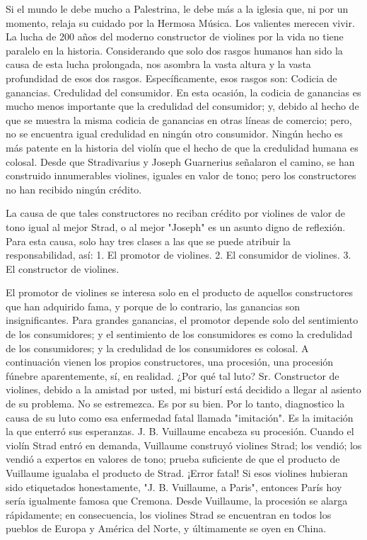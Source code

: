 \documentclass[12pt]{book}
\begin{document}
Si el mundo le debe mucho a Palestrina, le debe más a la iglesia que, ni por un momento, relaja su cuidado por la Hermosa Música. Los valientes merecen vivir. La lucha de 200 años del moderno constructor de violines por la vida no tiene paralelo en la historia. Considerando que solo dos rasgos humanos han sido la causa de esta lucha prolongada, nos asombra la vasta altura y la vasta profundidad de esos dos rasgos. Específicamente, esos rasgos son: Codicia de ganancias. Credulidad del consumidor. En esta ocasión, la codicia de ganancias es mucho menos importante que la credulidad del consumidor; y, debido al hecho de que se muestra la misma codicia de ganancias en otras líneas de comercio; pero, no se encuentra igual credulidad en ningún otro consumidor. Ningún hecho es más patente en la historia del violín que el hecho de que la credulidad humana es colosal. Desde que Stradivarius y Joseph Guarnerius señalaron el camino, se han construido innumerables violines, iguales en valor de tono; pero los constructores no han recibido ningún crédito.

La causa de que tales constructores no reciban crédito por violines de valor de tono igual al mejor Strad, o al mejor "Joseph" es un asunto digno de reflexión. Para esta causa, solo hay tres clases a las que se puede atribuir la responsabilidad, así: 1. El promotor de violines. 2. El consumidor de violines. 3. El constructor de violines.

El promotor de violines se interesa solo en el producto de aquellos constructores que han adquirido fama, y porque de lo contrario, las ganancias son insignificantes. Para grandes ganancias, el promotor depende solo del sentimiento de los consumidores; y el sentimiento de los consumidores es como la credulidad de los consumidores; y la credulidad de los consumidores es colosal. A continuación vienen los propios constructores, una procesión, una procesión fúnebre aparentemente, sí, en realidad. ¿Por qué tal luto? Sr. Constructor de violines, debido a la amistad por usted, mi bisturí está decidido a llegar al asiento de su problema. No se estremezca. Es por su bien. Por lo tanto, diagnostico la causa de su luto como esa enfermedad fatal llamada "imitación". Es la imitación la que enterró sus esperanzas. J. B. Vuillaume encabeza su procesión. Cuando el violín Strad entró en demanda, Vuillaume construyó violines Strad; los vendió; los vendió a expertos en valores de tono; prueba suficiente de que el producto de Vuillaume igualaba el producto de Strad. ¡Error fatal! Si esos violines hubieran sido etiquetados honestamente, "J. B. Vuillaume, a Paris", entonces París hoy sería igualmente famosa que Cremona.
Desde Vuillaume, la procesión se alarga rápidamente; en consecuencia, los violines Strad se encuentran en todos los pueblos de Europa y América del Norte, y últimamente se oyen en China.
\end{document}
